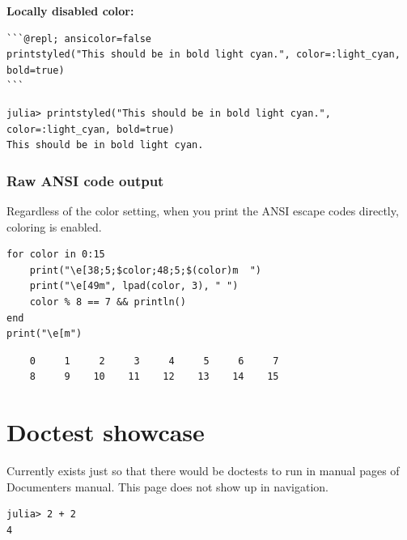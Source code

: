 \textbf{Locally disabled color:}




\begin{verbatim}
```@repl; ansicolor=false
printstyled("This should be in bold light cyan.", color=:light_cyan, bold=true)
```
\end{verbatim}




\begin{verbatim}
julia> printstyled("This should be in bold light cyan.", color=:light_cyan, bold=true)
This should be in bold light cyan.
\end{verbatim}



\subsubsection{Raw ANSI code output}



\label{13267379516757075300}{}


Regardless of the color setting, when you print the ANSI escape codes directly, coloring is enabled.




\begin{verbatim}
for color in 0:15
    print("\e[38;5;$color;48;5;$(color)m  ")
    print("\e[49m", lpad(color, 3), " ")
    color % 8 == 7 && println()
end
print("\e[m")
\end{verbatim}


\begin{verbatim}
    0     1     2     3     4     5     6     7
    8     9    10    11    12    13    14    15

\end{verbatim}



\section{Doctest showcase}



\label{2602340166667619136}{}


Currently exists just so that there would be doctests to run in manual pages of Documenter{\textquotesingle}s manual. This page does not show up in navigation.




\begin{verbatim}
julia> 2 + 2
4
\end{verbatim}



